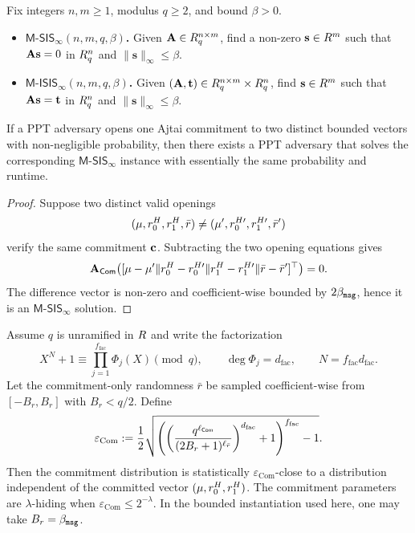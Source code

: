 \begin{definition}\label{def:sis-isis}
Fix integers $n,m\ge 1$, modulus $q\ge 2$, and bound $\beta>0$.
\begin{itemize}[leftmargin=1.25em]
  \item \textbf{$\mathsf{M\text{-}SIS}_\infty(n,m,q,\beta)$.} Given $\mathbf{A}\in R_q^{n\times m}$, find a non-zero
  $\mathbf{s}\in R^m$ such that $\mathbf{A}\mathbf{s}=0$ in $R_q^n$ and $\|\mathbf{s}\|_\infty\le \beta$.
  \item \textbf{$\mathsf{M\text{-}ISIS}_\infty(n,m,q,\beta)$.} Given $(\mathbf{A},\mathbf{t})\in R_q^{n\times m}\times R_q^n$,
  find $\mathbf{s}\in R^m$ such that $\mathbf{A}\mathbf{s}=\mathbf{t}$ in $R_q^n$ and
  $\|\mathbf{s}\|_\infty\le \beta$.
\end{itemize}
\end{definition}

\begin{lemma}\label{lem:ajtai-binding}
If a PPT adversary opens one Ajtai commitment to two distinct bounded vectors with non-negligible
probability, then there exists a PPT adversary that solves the corresponding
$\mathsf{M\text{-}SIS}_\infty$ instance with essentially the same probability and runtime.
\end{lemma}

\begin{proof}
Suppose two distinct valid openings
\[
  (\mathbf{\mu},r_0^H,r_1^H,\bar r)\neq (\mathbf{\mu}',r_0^{H\prime},r_1^{H\prime},\bar r')
\]
verify the same commitment $\mathbf{c}$.  Subtracting the two opening equations gives
\[
  \mathbf{A}_{\mathsf{Com}}\bigl([
    \mathbf{\mu}-\mathbf{\mu}'\Vert
    r_0^H-r_0^{H\prime}\Vert
    r_1^H-r_1^{H\prime}\Vert
    \bar r-\bar r']^\top
  \bigr)=0.
\]
The difference vector is non-zero and coefficient-wise bounded by $2\beta_{\mathtt{msg}}$, hence it is an
$\mathsf{M\text{-}SIS}_\infty$ solution.
\end{proof}

\begin{lemma}\label{lem:ajtai-hiding}
Assume $q$ is unramified in $R$ and write the factorization
\[
  X^N+1 \equiv \prod_{j=1}^{f_{\mathrm{fac}}}\Phi_j(X) \pmod q,
  \qquad
  \deg \Phi_j=d_{\mathrm{fac}},
  \qquad
  N=f_{\mathrm{fac}}d_{\mathrm{fac}}.
\]
Let the commitment-only randomness $\bar r$ be sampled coefficient-wise from $[-B_r,B_r]$ with
$B_r<q/2$.  Define
\[
  \varepsilon_{\mathrm{Com}}
  :=
  \frac12
  \sqrt{
    \left(
      \left(
        \frac{q^{\ell_{\mathsf{Com}}}}{(2B_r+1)^{\ell_{\bar r}}}
      \right)^{d_{\mathrm{fac}}}
      +1
    \right)^{f_{\mathrm{fac}}}
    -1
  }.
\]
Then the commitment distribution is statistically $\varepsilon_{\mathrm{Com}}$-close to a distribution
independent of the committed vector $(\mathbf{\mu},r_0^H,r_1^H)$.  The commitment parameters are
$\lambda$-hiding when $\varepsilon_{\mathrm{Com}}\le 2^{-\lambda}$.  In the bounded instantiation used here,
one may take $B_r=\beta_{\mathtt{msg}}$.
\end{lemma}

